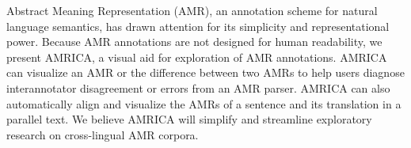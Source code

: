 Abstract Meaning Representation (AMR), an annotation scheme for natural language semantics, has drawn attention for its simplicity and representational power. Because AMR annotations are not designed for human readability, we present AMRICA, a visual aid for exploration of AMR annotations. AMRICA can visualize an AMR or the difference between two AMRs to help users diagnose interannotator disagreement or errors from an AMR parser. AMRICA can also automatically align and visualize the AMRs of a sentence and its translation in a parallel text. We believe AMRICA will simplify and streamline exploratory research on cross-lingual AMR corpora.
